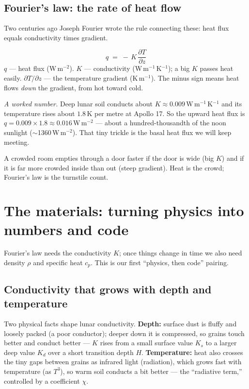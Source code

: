 \documentclass[11pt]{article}
\begin{document}
\subsection{Fourier's law: the rate of heat flow}
Two centuries ago Joseph Fourier wrote the rule connecting these: heat
flux equals conductivity times gradient.

\begin{mathbox}
\[
q \;=\; -\,K\,\frac{\partial T}{\partial z}
\]
\textbf{$q$} --- heat flux (W\,m$^{-2}$). \textbf{$K$} --- conductivity
(W\,m$^{-1}$\,K$^{-1}$); a big $K$ passes heat easily. \textbf{$\partial
T/\partial z$} --- the temperature gradient (K\,m$^{-1}$). The minus sign
means heat flows \emph{down} the gradient, from hot toward cold.
\end{mathbox}

\emph{A worked number.} Deep lunar soil conducts about
$K\approx0.009\,$W\,m$^{-1}$\,K$^{-1}$ and its temperature rises about
$1.8\,$K per metre at Apollo 17. So the upward heat flux is
$q = 0.009\times1.8 \approx 0.016\,$W\,m$^{-2}$ --- about a hundred-thousandth
of the noon sunlight ($\sim$1360\,W\,m$^{-2}$). That tiny trickle is the
basal heat flux we will keep meeting.

\begin{plainbox}
A crowded room empties through a door faster if the door is wide (big
$K$) and if it is far more crowded inside than out (steep gradient). Heat
is the crowd; Fourier's law is the turnstile count.
\end{plainbox}

\section{The materials: turning physics into numbers and code}
Fourier's law needs the conductivity $K$; once things change in time we
also need density $\rho$ and specific heat $c_p$. This is our first
``physics, then code'' pairing.

\subsection{Conductivity that grows with depth and temperature}
Two physical facts shape lunar conductivity. \textbf{Depth:} surface dust
is fluffy and loosely packed (a poor conductor); deeper down it is
compressed, so grains touch better and conduct better --- $K$ rises from a
small surface value $K_s$ to a larger deep value $K_d$ over a short
transition depth $H$. \textbf{Temperature:} heat also crosses the tiny
gaps between grains as infrared light (radiation), which grows fast with
temperature (as $T^3$), so warm soil conducts a bit better --- the
``radiative term,'' controlled by a coefficient $\chi$.
\end{document}
